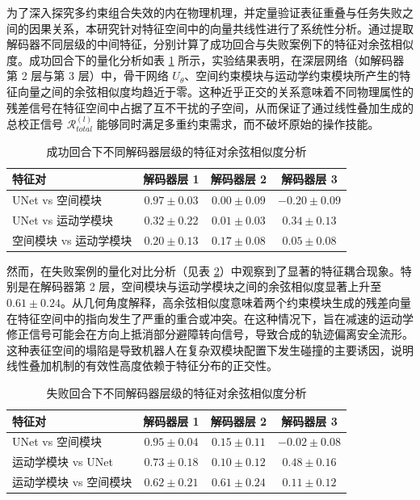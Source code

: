 为了深入探究多约束组合失效的内在物理机理，并定量验证表征重叠与任务失败之间的因果关系，本研究针对特征空间中的向量共线性进行了系统性分析。通过提取解码器不同层级的中间特征，分别计算了成功回合与失败案例下的特征对余弦相似度。成功回合下的量化分析如表 \ref{tab:cosine_similarity_success} 所示，实验结果表明，在深层网络（如解码器第 2 层与第 3 层）中，骨干网络 $U_{\theta}$、空间约束模块与运动学约束模块所产生的特征向量之间的余弦相似度均趋近于零。这种近乎正交的关系意味着不同物理属性的残差信号在特征空间中占据了互不干扰的子空间，从而保证了通过线性叠加生成的总校正信号 $\mathcal{R}_{total}^{(l)}$ 能够同时满足多重约束需求，而不破坏原始的操作技能。
\begin{table}[htbp]
\centering
\caption{成功回合下不同解码器层级的特征对余弦相似度分析}
\label{tab:cosine_similarity_success}
\begin{tabular}{lccc}
\hline
特征对 & 解码器层 1 & 解码器层 2 & 解码器层 3 \\ \hline
UNet vs 空间模块 & $0.97 \pm 0.03$ & $0.00 \pm 0.09$ & $-0.20 \pm 0.09$ \\
UNet vs 运动学模块 & $0.32 \pm 0.22$ & $0.01 \pm 0.03$ & $0.34 \pm 0.13$ \\
空间模块 vs 运动学模块 & $0.20 \pm 0.13$ & $0.17 \pm 0.08$ & $0.05 \pm 0.08$ \\ \hline
\end{tabular}
\end{table}

然而，在失败案例的量化对比分析（见表 \ref{tab:cosine_similarity_failure}）中观察到了显著的特征耦合现象。特别是在解码器第 2 层，空间模块与运动学模块之间的余弦相似度显著上升至 $0.61 \pm 0.24$。从几何角度解释，高余弦相似度意味着两个约束模块生成的残差向量在特征空间中的指向发生了严重的重合或冲突。在这种情况下，旨在减速的运动学修正信号可能会在方向上抵消部分避障转向信号，导致合成的轨迹偏离安全流形。这种表征空间的塌陷是导致机器人在复杂双模块配置下发生碰撞的主要诱因，说明线性叠加机制的有效性高度依赖于特征分布的正交性。
\begin{table}[htbp]
\centering
\caption{失败回合下不同解码器层级的特征对余弦相似度分析}
\label{tab:cosine_similarity_failure}
\begin{tabular}{lccc}
\hline
特征对 & 解码器层 1 & 解码器层 2 & 解码器层 3 \\ \hline
UNet vs 空间模块 & $0.95 \pm 0.04$ & $0.15 \pm 0.11$ & $-0.02 \pm 0.08$ \\
运动学模块 vs UNet & $0.73 \pm 0.18$ & $0.10 \pm 0.12$ & $0.48 \pm 0.16$ \\
运动学模块 vs 空间模块 & $0.62 \pm 0.21$ & $0.61 \pm 0.24$ & $0.11 \pm 0.12$ \\ \hline
\end{tabular}
\end{table}

